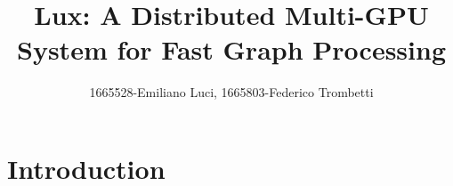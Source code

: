 \documentclass[]{article}
\title{Lux: A Distributed Multi-GPU System for Fast Graph Processing}
\author{1665528-Emiliano Luci, 1665803-Federico Trombetti}
\begin{document}
\maketitle

\section{Introduction}
\end{document}
